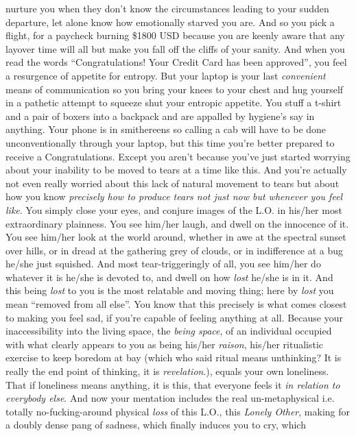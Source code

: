 \documentclass{article}
\begin{document}
nurture you when they don't know the circumstances leading to your
sudden departure, let alone know how emotionally starved you are. And so
you pick a flight, for a paycheck burning \$1800 USD because you are
keenly aware that any layover time will all but make you fall off the
cliffs of your sanity. And when you read the words ``Congratulations!
Your Credit Card has been approved'', you feel a resurgence of appetite
for entropy. But your laptop is your last \textit{convenient} means of
communication so you bring your knees to your chest and hug yourself in
a pathetic attempt to squeeze shut your entropic appetite. You stuff
a t-shirt and a pair of boxers into a backpack and are appalled by
hygiene's say in anything. Your phone is in smithereens so calling a cab
will have to be done unconventionally through your laptop, but this time
you're better prepared to receive a Congratulations. Except you aren't
because you've just started worrying about your inability to be moved to
tears at a time like this. And you're actually not even really worried
about this lack of natural movement to tears but about how you know
\textit{precisely how to produce tears not just now but whenever you
feel like}. You simply close your eyes, and conjure images of the L.O.
in his/her most extraordinary plainness. You see him/her laugh, and
dwell on the innocence of it. You see him/her look at the world around,
whether in awe at the spectral sunset over hills, or in dread at the
gathering grey of clouds, or in indifference at a bug he/she just
squished. And most tear-triggeringly of all, you see him/her do whatever
it is he/she is devoted to, and dwell on how \textit{lost} he/she is in
it. And this being \textit{lost} to you is the most relatable and moving
thing; here by \textit{lost} you mean ``removed from all else''. You
know that this precisely is what comes closest to making you feel sad,
if you're capable of feeling anything at all. Because your
inaccessibility into the living space, the \textit{being space}, of an
individual occupied with what clearly appears to you as being his/her
\textit{raison}, his/her ritualistic exercise to keep boredom at bay
(which who said ritual means unthinking? It is really the end point of
thinking, it is \textit{revelation}.), equals your own loneliness. That
if loneliness means anything, it is this, that everyone feels it
\textit{in relation to everybody else}. And now your mentation includes
the real un-metaphysical i.e. totally no-fucking-around physical
\textit{loss} of this L.O., this \textit{Lonely Other}, making for
a doubly dense pang of sadness, which finally induces you to cry, which
\end{document}
